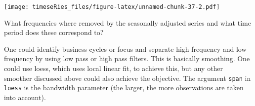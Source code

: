 \documentclass[]{book}
\newenvironment{Shaded}{\begin{snugshade}}{\end{snugshade}}
\newcommand{\KeywordTok}[1]{\textcolor[rgb]{0.13,0.29,0.53}{\textbf{#1}}}
\newcommand{\DataTypeTok}[1]{\textcolor[rgb]{0.13,0.29,0.53}{#1}}
\newcommand{\DecValTok}[1]{\textcolor[rgb]{0.00,0.00,0.81}{#1}}
\newcommand{\FloatTok}[1]{\textcolor[rgb]{0.00,0.00,0.81}{#1}}
\newcommand{\StringTok}[1]{\textcolor[rgb]{0.31,0.60,0.02}{#1}}
\newcommand{\OperatorTok}[1]{\textcolor[rgb]{0.81,0.36,0.00}{\textbf{#1}}}
\newcommand{\NormalTok}[1]{#1}
\begin{document}
\begin{Shaded}
\end{Shaded}

\texttt{[image: timeseRies\_files/figure-latex/unnamed-chunk-37-2.pdf]}

What frequencies where removed by the seasonally adjusted series and
what time period does these correspond to?

One could identify business cycles or focus and separate high frequency
and low frequency by using low pass or high pass filters. This is
basically smoothing. One could use loess, which uses local linear fit,
to achieve this, but any other smoother discussed above could also
achieve the objective. The argument \texttt{span} in \texttt{loess} is
the bandwidth parameter (the larger, the more observations are taken
into account).
\end{document}
